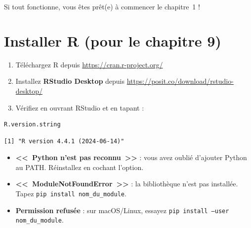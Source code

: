 Si tout fonctionne, vous \^etes pr\^et(e) \`a commencer le chapitre~1 !

\section*{Installer R (pour le chapitre 9)}

\begin{enumerate}
\item T\'el\'echargez R depuis \url{https://cran.r-project.org/}
\item Installez \textbf{RStudio Desktop} depuis \url{https://posit.co/download/rstudio-desktop/}
\item V\'erifiez en ouvrant RStudio et en tapant :
\end{enumerate}

\begin{codeblock}[title=\textbf{Console R}]
\begin{verbatim}
R.version.string
\end{verbatim}
\end{codeblock}

\begin{codeoutput}
\begin{verbatim}
[1] "R version 4.4.1 (2024-06-14)"
\end{verbatim}
\end{codeoutput}

\begin{errmark}
\begin{itemize}
\item \textbf{<<~Python n'est pas reconnu~>>} : vous avez oubli\'e d'ajouter Python au PATH. R\'einstallez en cochant l'option.
\item \textbf{<<~ModuleNotFoundError~>>} : la biblioth\`eque n'est pas install\'ee. Tapez \texttt{pip install nom\_du\_module}.
\item \textbf{Permission refus\'ee} : sur macOS/Linux, essayez \texttt{pip install --user nom\_du\_module}.
\end{itemize}
\end{errmark}
